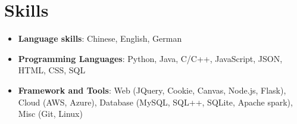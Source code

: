 \documentclass[letterpaper,11pt]{article}
\newcommand{\resumeSubHeadingListStart}{\begin{itemize}[leftmargin=*]}
\newcommand{\resumeSubHeadingListEnd}{\end{itemize}}
\begin{document}
\section{Skills}
  \resumeSubHeadingListStart
    \item{\textbf{Language skills}{: Chinese, English, German}}
     \vspace{-5pt}
    \item{\textbf{Programming Languages}{: Python, Java, C/C++, JavaScript, JSON, HTML, CSS, SQL}}
     \vspace{-5pt}
    \item{\textbf{Framework and Tools}{: Web (JQuery, Cookie, Canvas, Node.js, Flask), Cloud (AWS, Azure), Database (MySQL, SQL++, SQLite, Apache spark), Misc (Git, Linux)}}
  \resumeSubHeadingListEnd
\end{document}
